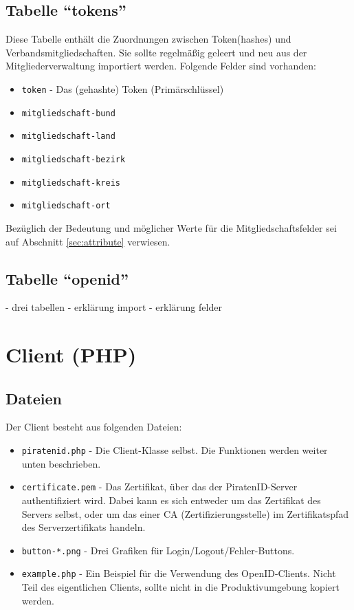 \documentclass[parskip=half]{scrartcl}
\begin{document}
\subsection{Tabelle "`tokens"'}
Diese Tabelle enthält die Zuordnungen zwischen Token(hashes) und Verbandsmitgliedschaften.
Sie sollte regelmäßig geleert und neu aus der Mitgliederverwaltung importiert werden.
Folgende Felder sind vorhanden:
\begin{itemize}
	\item \texttt{token} - Das (gehashte) Token (Primärschlüssel)
	\item \texttt{mitgliedschaft-bund}
	\item \texttt{mitgliedschaft-land}
	\item \texttt{mitgliedschaft-bezirk}
	\item \texttt{mitgliedschaft-kreis}
	\item \texttt{mitgliedschaft-ort}
\end{itemize}

Bezüglich der Bedeutung und möglicher Werte für die Mitgliedschaftsfelder sei auf Abschnitt \ref{sec:attribute} verwiesen.

\subsection{Tabelle "`openid"'}
- drei tabellen
- erklärung import
- erklärung felder


\section{Client (PHP)}


\subsection{Dateien}
Der Client besteht aus folgenden Dateien:
\begin{itemize}
	\item \texttt{piratenid.php} -
		Die Client-Klasse selbst. Die Funktionen werden weiter unten beschrieben.
	\item \texttt{certificate.pem} - 
		Das Zertifikat, über das der PiratenID-Server authentifiziert wird.
		Dabei kann es sich entweder um das Zertifikat des Servers selbst,
		oder um das einer CA (Zertifizierungsstelle) im Zertifikatspfad des Serverzertifikats handeln.
	\item \texttt{button-*.png} -
		Drei Grafiken für Login/Logout/Fehler-Buttons.
	\item \texttt{example.php} -
		Ein Beispiel für die Verwendung des OpenID-Clients. Nicht Teil des eigentlichen Clients, sollte nicht in die Produktivumgebung kopiert werden.
\end{itemize}
\end{document}
